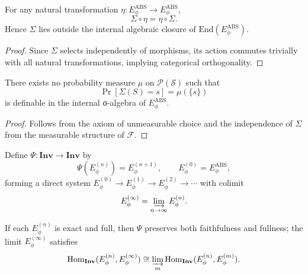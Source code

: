 \begin{proposition}\label{prop:sigma-independence}
For any natural transformation $\eta:E_\phi^{\mathrm{ABS}}\to E_\phi^{\mathrm{ABS}}$,
\[
\Sigma\circ\eta=\eta\circ\Sigma.
\]
Hence $\Sigma$ lies outside the internal algebraic closure of $\mathrm{End}(E_\phi^{\mathrm{ABS}})$.
\end{proposition}

\begin{proof}
Since $\Sigma$ selects independently of morphisms, its action commutes trivially with all natural transformations, implying categorical orthogonality. \relax
\end{proof}

\begin{theorem}\label{thm:sigma-indeterminacy}
There exists no probability measure $\mu$ on $\mathcal{P}(\mathcal S)$ such that 
\[
\Pr[\Sigma(S)=s]=\mu(\{s\})
\]
is definable in the internal σ-algebra of $E_\phi^{\mathrm{ABS}}$.
\end{theorem}

\begin{proof}
Follows from the axiom of unmeasurable choice and the independence of $\Sigma$ from the measurable structure of $\mathcal F$. \relax
\end{proof}


\begin{definition}\label{def:psi}
Define $\Psi:\mathbf{Inv}\longrightarrow\mathbf{Inv}$ by
\[
\Psi(E_\phi^{(n)})=E_\phi^{(n+1)},\qquad
E_\phi^{(0)}=E_\phi^{\mathrm{ABS}},
\]
forming a direct system 
$E_\phi^{(0)}\to E_\phi^{(1)}\to E_\phi^{(2)}\to\cdots$
with colimit
\[
E_\phi^{(\infty)}=\varinjlim_{n\to\infty}E_\phi^{(n)}.
\]
\end{definition}

\begin{lemma}\label{lem:reflexive-faithfulness}
If each $E_\phi^{(n)}$ is exact and full, then $\Psi$ preserves both faithfulness and fullness; the limit $E_\phi^{(\infty)}$ satisfies
\[
\mathrm{Hom}_{\mathbf{Inv}}(E_\phi^{(n)},E_\phi^{(\infty)})\cong
\varinjlim_m\mathrm{Hom}_{\mathbf{Inv}}(E_\phi^{(n)},E_\phi^{(m)}).
\]
\end{lemma}

